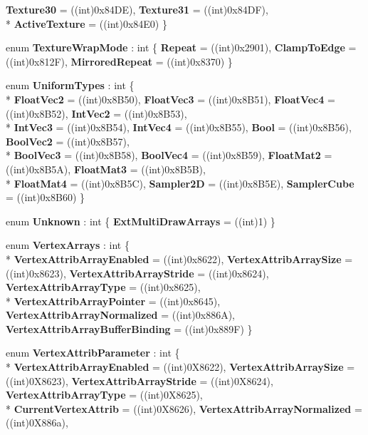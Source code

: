 \begin{DoxyCompactItemize}
{\bfseries Texture30} = ((int)0x84\-D\-E), 
{\bfseries Texture31} = ((int)0x84\-D\-F), 
\\*
{\bfseries Active\-Texture} = ((int)0x84\-E0)
 \}
\item 
enum {\bfseries Texture\-Wrap\-Mode} \-: int \{ {\bfseries Repeat} = ((int)0x2901), 
{\bfseries Clamp\-To\-Edge} = ((int)0x812\-F), 
{\bfseries Mirrored\-Repeat} = ((int)0x8370)
 \}
\item 
enum {\bfseries Uniform\-Types} \-: int \{ \\*
{\bfseries Float\-Vec2} = ((int)0x8\-B50), 
{\bfseries Float\-Vec3} = ((int)0x8\-B51), 
{\bfseries Float\-Vec4} = ((int)0x8\-B52), 
{\bfseries Int\-Vec2} = ((int)0x8\-B53), 
\\*
{\bfseries Int\-Vec3} = ((int)0x8\-B54), 
{\bfseries Int\-Vec4} = ((int)0x8\-B55), 
{\bfseries Bool} = ((int)0x8\-B56), 
{\bfseries Bool\-Vec2} = ((int)0x8\-B57), 
\\*
{\bfseries Bool\-Vec3} = ((int)0x8\-B58), 
{\bfseries Bool\-Vec4} = ((int)0x8\-B59), 
{\bfseries Float\-Mat2} = ((int)0x8\-B5\-A), 
{\bfseries Float\-Mat3} = ((int)0x8\-B5\-B), 
\\*
{\bfseries Float\-Mat4} = ((int)0x8\-B5\-C), 
{\bfseries Sampler2\-D} = ((int)0x8\-B5\-E), 
{\bfseries Sampler\-Cube} = ((int)0x8\-B60)
 \}
\item 
enum {\bfseries Unknown} \-: int \{ {\bfseries Ext\-Multi\-Draw\-Arrays} = ((int)1)
 \}
\item 
enum {\bfseries Vertex\-Arrays} \-: int \{ \\*
{\bfseries Vertex\-Attrib\-Array\-Enabled} = ((int)0x8622), 
{\bfseries Vertex\-Attrib\-Array\-Size} = ((int)0x8623), 
{\bfseries Vertex\-Attrib\-Array\-Stride} = ((int)0x8624), 
{\bfseries Vertex\-Attrib\-Array\-Type} = ((int)0x8625), 
\\*
{\bfseries Vertex\-Attrib\-Array\-Pointer} = ((int)0x8645), 
{\bfseries Vertex\-Attrib\-Array\-Normalized} = ((int)0x886\-A), 
{\bfseries Vertex\-Attrib\-Array\-Buffer\-Binding} = ((int)0x889\-F)
 \}
\item 
enum {\bfseries Vertex\-Attrib\-Parameter} \-: int \{ \\*
{\bfseries Vertex\-Attrib\-Array\-Enabled} = ((int)0\-X8622), 
{\bfseries Vertex\-Attrib\-Array\-Size} = ((int)0\-X8623), 
{\bfseries Vertex\-Attrib\-Array\-Stride} = ((int)0\-X8624), 
{\bfseries Vertex\-Attrib\-Array\-Type} = ((int)0\-X8625), 
\\*
{\bfseries Current\-Vertex\-Attrib} = ((int)0\-X8626), 
{\bfseries Vertex\-Attrib\-Array\-Normalized} = ((int)0\-X886a), 

\end{DoxyCompactItemize}
